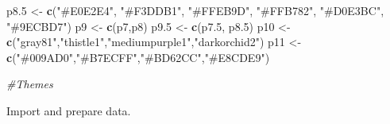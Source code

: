 \documentclass[
]{article}
\newenvironment{Shaded}{\begin{snugshade}}{\end{snugshade}}
\newcommand{\CommentTok}[1]{\textcolor[rgb]{0.56,0.35,0.01}{\textit{#1}}}
\newcommand{\FloatTok}[1]{\textcolor[rgb]{0.00,0.00,0.81}{#1}}
\newcommand{\FunctionTok}[1]{\textcolor[rgb]{0.13,0.29,0.53}{\textbf{#1}}}
\newcommand{\NormalTok}[1]{#1}
\newcommand{\OtherTok}[1]{\textcolor[rgb]{0.56,0.35,0.01}{#1}}
\newcommand{\StringTok}[1]{\textcolor[rgb]{0.31,0.60,0.02}{#1}}
\begin{document}
\begin{Shaded}
\begin{Highlighting}[]
\NormalTok{p8}\FloatTok{.5} \OtherTok{\textless{}{-}} \FunctionTok{c}\NormalTok{(}\StringTok{"\#E0E2E4"}\NormalTok{, }\StringTok{"\#F3DDB1"}\NormalTok{, }\StringTok{"\#FFEB9D"}\NormalTok{, }\StringTok{"\#FFB782"}\NormalTok{, }\StringTok{"\#D0E3BC"}\NormalTok{, }\StringTok{"\#9ECBD7"}\NormalTok{)}
\NormalTok{p9 }\OtherTok{\textless{}{-}} \FunctionTok{c}\NormalTok{(p7,p8)}
\NormalTok{p9}\FloatTok{.5} \OtherTok{\textless{}{-}} \FunctionTok{c}\NormalTok{(p7}\FloatTok{.5}\NormalTok{, p8}\FloatTok{.5}\NormalTok{)}
\NormalTok{p10 }\OtherTok{\textless{}{-}} \FunctionTok{c}\NormalTok{(}\StringTok{"gray81"}\NormalTok{,}\StringTok{"thistle1"}\NormalTok{,}\StringTok{"mediumpurple1"}\NormalTok{,}\StringTok{"darkorchid2"}\NormalTok{)}
\NormalTok{p11 }\OtherTok{\textless{}{-}} \FunctionTok{c}\NormalTok{(}\StringTok{"\#009AD0"}\NormalTok{,}\StringTok{"\#B7ECFF"}\NormalTok{,}\StringTok{"\#BD62CC"}\NormalTok{,}\StringTok{"\#E8CDE9"}\NormalTok{)}

\CommentTok{\#Themes}
\end{Highlighting}
\end{Shaded}

Import and prepare data.
\end{document}
